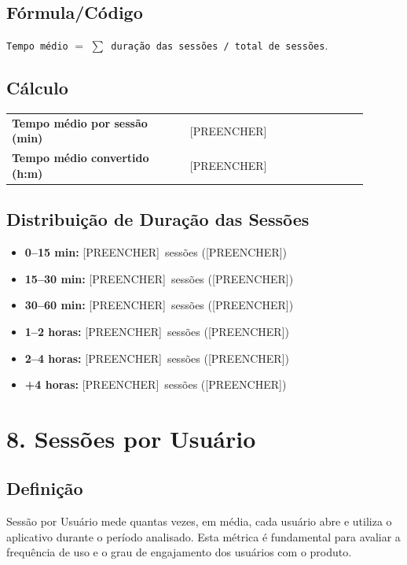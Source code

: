 \documentclass[12pt]{article}
\providecommand{\TempoMedioHM}{[PREENCHER]}
\providecommand{\TempoMedioMin}{[PREENCHER]}
\providecommand{\DurZeroAQuinze}{[PREENCHER]}\providecommand{\DurZeroAQuinzePct}{[PREENCHER]}
\providecommand{\DurQuinzeATrinta}{[PREENCHER]}\providecommand{\DurQuinzeATrintaPct}{[PREENCHER]}
\providecommand{\DurTrintaASessenta}{[PREENCHER]}\providecommand{\DurTrintaASessentaPct}{[PREENCHER]}
\providecommand{\DurUmaADuasHoras}{[PREENCHER]}\providecommand{\DurUmaADuasHorasPct}{[PREENCHER]}
\providecommand{\DurDuasAQuatroHoras}{[PREENCHER]}\providecommand{\DurDuasAQuatroHorasPct}{[PREENCHER]}
\providecommand{\DurMaisDeQuatroHoras}{[PREENCHER]}\providecommand{\DurMaisDeQuatroHorasPct}{[PREENCHER]}
\begin{document}
\subsection*{Fórmula/Código}
\noindent \texttt{Tempo médio} $=$ \texttt{$\sum$ duração das sessões / total de sessões}.

\subsection*{Cálculo}
\begin{center}
\begin{tabular}{>{\bfseries}p{0.45\linewidth} p{0.45\linewidth}}
\toprule
Tempo médio por sessão (min) & \TempoMedioMin \\
Tempo médio convertido (h:m) & \TempoMedioHM \\
\bottomrule
\end{tabular}
\end{center}

\subsection*{Distribuição de Duração das Sessões}
\begin{itemize}
  \item \textbf{0--15 min:} \DurZeroAQuinze\ sessões (\DurZeroAQuinzePct)
  \item \textbf{15--30 min:} \DurQuinzeATrinta\ sessões (\DurQuinzeATrintaPct)
  \item \textbf{30--60 min:} \DurTrintaASessenta\ sessões (\DurTrintaASessentaPct)
  \item \textbf{1--2 horas:} \DurUmaADuasHoras\ sessões (\DurUmaADuasHorasPct)
  \item \textbf{2--4 horas:} \DurDuasAQuatroHoras\ sessões (\DurDuasAQuatroHorasPct)
  \item \textbf{+4 horas:} \DurMaisDeQuatroHoras\ sessões (\DurMaisDeQuatroHorasPct)
\end{itemize}

\section*{8. Sessões por Usuário}
\subsection*{Definição}
Sessão por Usuário mede quantas vezes, em média, cada usuário abre e utiliza o aplicativo durante o período analisado. Esta métrica é fundamental para avaliar a frequência de uso e o grau de engajamento dos usuários com o produto.
\end{document}
